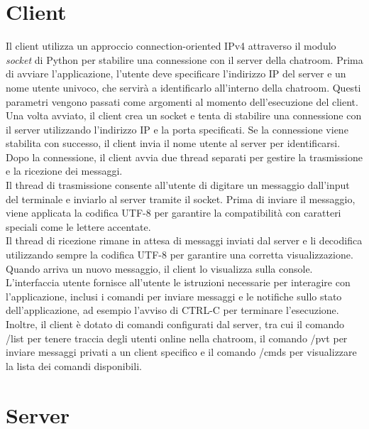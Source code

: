 \documentclass[a4paper,12pt]{report}
\begin{document}
\chapter{Client}
Il client utilizza un approccio connection-oriented IPv4 attraverso il modulo \textit{socket} di Python per stabilire una connessione con il server della chatroom. Prima di avviare l'applicazione, l'utente deve specificare l'indirizzo IP del server e un nome utente univoco, che servirà a identificarlo all'interno della chatroom. Questi parametri vengono passati come argomenti al momento dell'esecuzione del client.
\\
Una volta avviato, il client crea un socket e tenta di stabilire una connessione con il server utilizzando l'indirizzo IP e la porta specificati. Se la connessione viene stabilita con successo, il client invia il nome utente al server per identificarsi.
\\
Dopo la connessione, il client avvia due thread separati per gestire la trasmissione e la ricezione dei messaggi. 
\\
Il thread di trasmissione consente all'utente di digitare un messaggio dall'input del terminale e inviarlo al server tramite il socket. Prima di inviare il messaggio, viene applicata la codifica UTF-8 per garantire la compatibilità con caratteri speciali come le lettere accentate.
\\
Il thread di ricezione rimane in attesa di messaggi inviati dal server e li decodifica utilizzando sempre la codifica UTF-8 per garantire una corretta visualizzazione. Quando arriva un nuovo messaggio, il client lo visualizza sulla console.
\\
L'interfaccia utente fornisce all'utente le istruzioni necessarie per interagire con l'applicazione, inclusi i comandi per inviare messaggi e le notifiche sullo stato dell'applicazione, ad esempio l'avviso di CTRL-C per terminare l'esecuzione.
\\
Inoltre, il client è dotato di comandi configurati dal server, tra cui il comando /list per tenere traccia degli utenti online nella chatroom, il comando /pvt per inviare messaggi privati a un client specifico e il comando /cmds per visualizzare la lista dei comandi disponibili.
\chapter{Server}
\end{document}
